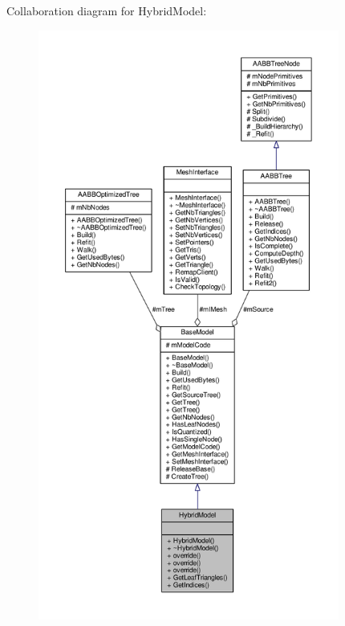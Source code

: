 Collaboration diagram for Hybrid\+Model\+:
\nopagebreak
\begin{figure}[H]
\begin{center}
\leavevmode
\includegraphics[height=550pt]{de/d3c/classHybridModel__coll__graph}
\end{center}
\end{figure}
